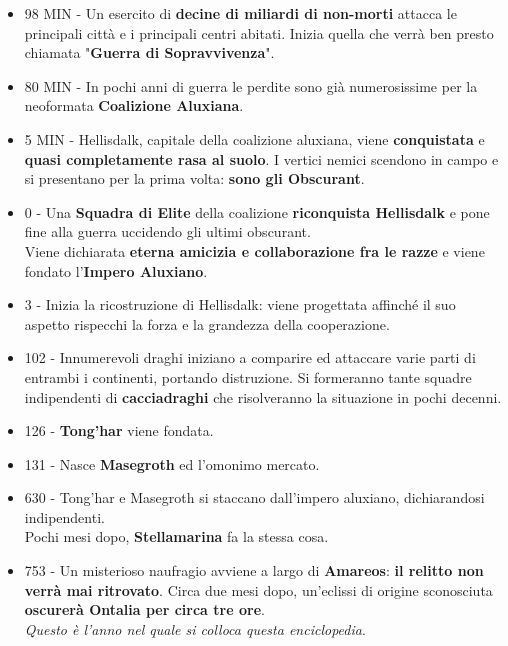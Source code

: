 \documentclass[10pt,twoside,onecolumn,openany]{book}
\begin{document}
\begin{multicols}{2}
\begin{itemize}
\item 98 MIN - Un esercito di \textbf{decine di miliardi di non-morti} attacca le principali città e i principali centri abitati. Inizia quella che verrà ben presto chiamata "\textbf{Guerra di Sopravvivenza}".\\
\item 80 MIN - In pochi anni di guerra le perdite sono già numerosissime per la neoformata \textbf{Coalizione Aluxiana}.\\
\item 5 MIN - Hellisdalk, capitale della coalizione aluxiana, viene \textbf{conquistata} e \textbf{quasi completamente rasa al suolo}. I vertici nemici scendono in campo e si presentano per la prima volta: \textbf{sono gli Obscurant}.\\
\item 0 - Una \textbf{Squadra di Elite} della coalizione \textbf{riconquista Hellisdalk} e pone fine alla guerra uccidendo gli ultimi obscurant.\\
Viene dichiarata \textbf{eterna amicizia e collaborazione fra le razze} e viene fondato l'\textbf{Impero Aluxiano}.\\
\item 3 - Inizia la ricostruzione di Hellisdalk: viene progettata affinché il suo aspetto rispecchi la forza e la grandezza della cooperazione.\\
\item 102 - Innumerevoli draghi iniziano a comparire ed attaccare varie parti di entrambi i continenti, portando distruzione. Si formeranno tante squadre indipendenti di \textbf{cacciadraghi} che risolveranno la situazione in pochi decenni.\\
\item 126 - \textbf{Tong'har} viene fondata.\\
\item 131 - Nasce \textbf{Masegroth} ed l'omonimo mercato.\\
\item 630 - Tong'har e Masegroth si staccano dall'impero aluxiano, dichiarandosi indipendenti.\\ Pochi mesi dopo, \textbf{Stellamarina} fa la stessa cosa.\\
\item 753 - Un misterioso naufragio avviene a largo di \textbf{Amareos}: \textbf{il relitto non verrà mai ritrovato}. Circa due mesi dopo, un'eclissi di origine sconosciuta \textbf{oscurerà Ontalia per circa tre ore}.\\ \textit{Questo è l'anno nel quale si colloca questa enciclopedia}.\\
\end{itemize}
\end{multicols}
\newpage
\end{document}
